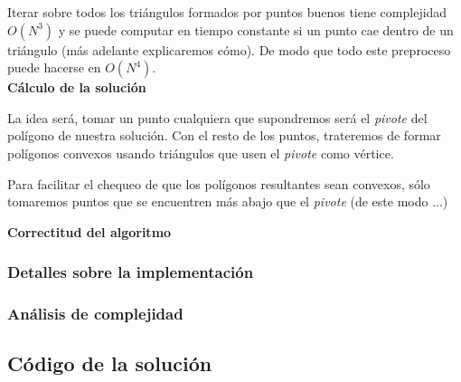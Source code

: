 Iterar sobre todos los triángulos formados por puntos buenos tiene complejidad 
$O(N^3)$ y se puede computar en tiempo constante si un punto cae dentro de un triángulo (más adelante 
explicaremos cómo). 
De modo que todo este preproceso puede hacerse en $O(N^4)$.\\

\textbf{Cálculo de la solución}

La idea será, tomar un punto cualquiera que supondremos será el \textit{pivote} 
del polígono de nuestra solución. Con el resto de los puntos, trateremos de formar polígonos 
convexos usando triángulos que usen el \textit{pivote} como vértice. 



Para facilitar el chequeo de 
que los polígonos resultantes sean convexos, sólo tomaremos puntos que se encuentren más abajo que el 
\textit{pivote} (de este modo ...)


\textbf{Correctitud del algoritmo}\\

\subsubsection{Detalles sobre la implementación}

\subsubsection{Análisis de complejidad}

\newpage
\subsection{Código de la solución}

